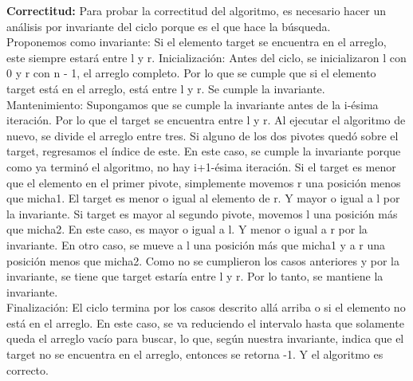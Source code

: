 \documentclass[12pt]{article}
\begin{document}
\begin{itemize}
    \textbf{Correctitud:} Para probar la correctitud del algoritmo, es necesario hacer un análisis por invariante del ciclo porque es el que hace la búsqueda.\\
    Proponemos como invariante: Si el elemento target se encuentra en el arreglo, este siempre estará entre l y r.
    Inicialización: Antes del ciclo, se inicializaron l con 0 y r con n - 1, el arreglo completo. Por lo que se cumple que si el elemento target está en el arreglo, está entre l y r. Se cumple la invariante.\\
    Mantenimiento: Supongamos que se cumple la invariante antes de la i-ésima iteración. Por lo que el target se encuentra entre l y r.
    Al ejecutar el algoritmo de nuevo, se divide el arreglo entre tres.
    Si alguno de los dos pivotes quedó sobre el target, regresamos el índice de este. En este caso, se cumple la invariante porque como ya terminó el algoritmo, no hay i+1-ésima iteración.
    Si el target es menor que el elemento en el primer pivote,
    simplemente movemos r una posición menos que micha1. El target es menor o igual al elemento de r. Y mayor o igual a l por la invariante.
    Si target es mayor al segundo pivote, movemos l una posición más que micha2. En este caso, es mayor o igual a l. Y menor o igual a r por la invariante.
    En otro caso, se mueve a l una posición más que micha1 y a r una posición menos que micha2. Como no se cumplieron los casos anteriores y por la invariante, se tiene que target estaría entre l y r.
    Por lo tanto, se mantiene la invariante.\\
    Finalización: El ciclo termina por los casos descrito allá arriba o si el elemento no está en el arreglo. En este caso, se va reduciendo el intervalo hasta que solamente queda el arreglo vacío para buscar, lo que, según nuestra invariante, indica que el target no se encuentra en el arreglo, entonces se retorna -1. Y el algoritmo es correcto.


\end{itemize}
\end{document}
